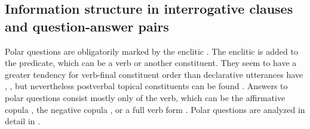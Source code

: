
\subsection{Information structure in interrogative clauses and question-answer pairs}
\label{ssec:Information structure in interrogative clauses and question-answer pairs}

Polar questions are obligatorily marked by the enclitic . The enclitic is added to the predicate, which can be a verb or another constituent. They seem to have a greater tendency for verb-final constituent order than declarative utterances have , , but nevertheless postverbal topical constituents can be found . Answers to polar questions consist mostly only of the verb, which can be the affirmative copula , the negative copula , or a full verb form . Polar questions are analyzed in detail in .
%
